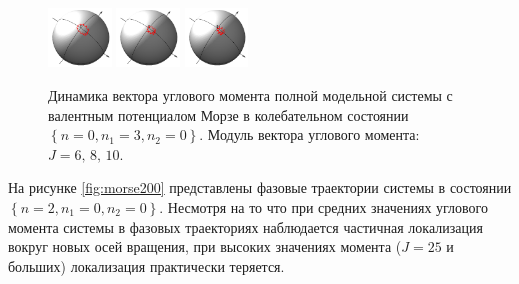 \begin{figure}[H]
  \centering
	\includegraphics[width=0.15\textwidth]{../pictures/MorseGroundState03/plot_J=6.png}
	\includegraphics[width=0.15\textwidth]{../pictures/MorseGroundState03/plot_J=8.png}
	\includegraphics[width=0.15\textwidth]{../pictures/MorseGroundState03/plot_J=10.png}
	\caption{Динамика вектора углового момента полной модельной системы с валентным потенциалом Морзе в колебательном состоянии $\left\{ n = 0, n_1 = 3, n_2 = 0 \right\}$. 
Модуль вектора углового момента: $J = 6, \, 8, \, 10$.}
\label{fig:morse030}
\end{figure}

На рисунке \eqref{fig:morse200} представлены фазовые траектории системы в состоянии $\left\{ n = 2, n_1 = 0, n_2 = 0 \right\}$. Несмотря на то что при средних значениях углового момента системы в фазовых траекториях наблюдается частичная локализация вокруг новых осей вращения, при высоких значениях момента ($J = 25$ и больших) локализация практически теряется. 
 

